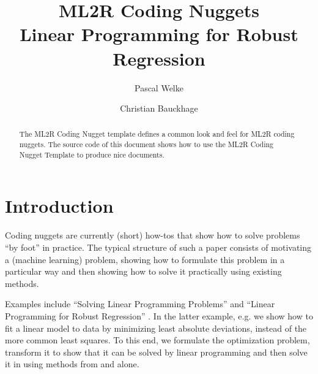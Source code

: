 \documentclass[nonacm,sigconf,fleqn,svgnames,screen]{acmart}
\begin{document}


\title[Linear Programming for Robust Regression]{ML2R Coding Nuggets \\ Linear Programming for Robust Regression}


\author[P. Welke]{Pascal Welke}

\author[C. Bauckhage]{Christian Bauckhage}

\begin{abstract}
The ML2R Coding Nugget template defines a common look and feel for ML2R coding nuggets. 
The source code of this document shows how to use the ML2R Coding Nugget Template to produce nice documents.
\end{abstract}

\maketitle



\section{Introduction}
Coding nuggets are currently (short) how-tos that show how to solve problems ``by foot'' in practice.
The typical structure of such a paper consists of motivating a (machine learning) problem, showing how to formulate this problem in a particular way and then showing how to solve it practically using existing methods. 

Examples include  ``Solving Linear Programming Problems'' \cite{Welke2020-SLP} and ``Linear Programming for Robust Regression'' \cite{Welke2020-SLP2}.
In the latter example, e.g. we show how to fit a linear model to data by minimizing least absolute deviations, instead of the more common least squares. 
To this end, we formulate the optimization problem, transform it to show that it can be solved by linear programming and then solve it in  using methods from  and  alone.  
\end{document}
